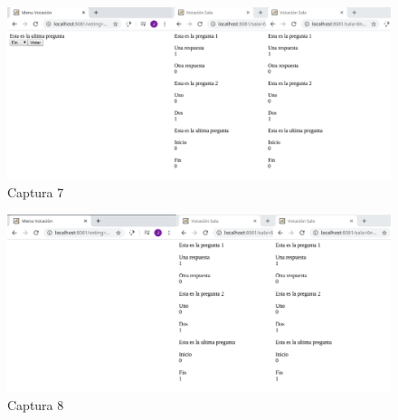 \documentclass{article}
\begin{document}
\begin{itemize}
	\begin{figure}[H]
		\centering
		\includegraphics[totalheight=9cm]{img/cap7}
		\caption{Captura 7}
		\label{fig:figura8}
	\end{figure}

	\begin{figure}[H]
		\centering
		\includegraphics[totalheight=9cm]{img/cap8}
		\caption{Captura 8}
		\label{fig:figura9}
	\end{figure}
\end{itemize}
\end{document}
